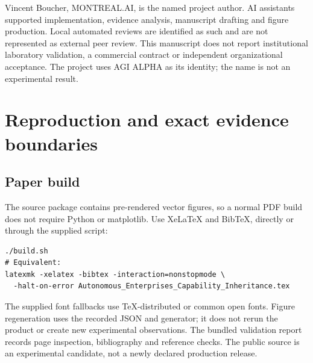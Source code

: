 \documentclass[11pt,a4paper]{article}
\begin{document}
Vincent Boucher, MONTREAL.AI, is the named project author. AI assistants supported implementation, evidence analysis, manuscript drafting and figure production. Local automated reviews are identified as such and are not represented as external peer review. This manuscript does not report institutional laboratory validation, a commercial contract or independent organizational acceptance. The project uses AGI ALPHA as its identity; the name is not an experimental result.

\clearpage
\appendix
\section{Reproduction and exact evidence boundaries}\label{app:provenance}
\subsection{Paper build}
The source package contains pre-rendered vector figures, so a normal PDF build does not require Python or matplotlib. Use XeLaTeX and BibTeX, directly or through the supplied script:
\begin{lstlisting}
./build.sh
# Equivalent:
latexmk -xelatex -bibtex -interaction=nonstopmode \
  -halt-on-error Autonomous_Enterprises_Capability_Inheritance.tex
\end{lstlisting}
The supplied font fallbacks use TeX-distributed or common open fonts. Figure regeneration uses the recorded JSON and generator; it does not rerun the product or create new experimental observations. The bundled validation report records page inspection, bibliography and reference checks. The public source is an experimental candidate, not a newly declared production release.
\end{document}
